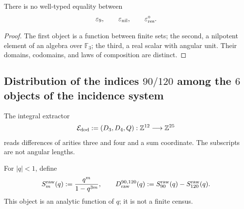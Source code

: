 {\begin{proposition}
\label{p12-83-c1-s7:prop:u006e-no-identificacion-epsilon}
There is no well-typed equality between
\[
 \varepsilon_9,\qquad
 \varepsilon_{\rm nil},\qquad
 \varepsilon_{\rm res}^{\circ}.
\]
\end{proposition}

\begin{proof}
The first object is a function between finite sets; the second, a
nilpotent element of an algebra over \(\mathbb F_3\); the third, a
real scalar with angular unit. Their domains, codomains, and laws of
composition are distinct.
\end{proof}

\subsection{Distribution of the indices \(90/120\) among the \(6\) objects of the incidence system}

\begin{definition}
\label{p12-83-c1-s7:def:u006e-extractor-dodecafasico}
The integral extractor
\begin{equation}
 \mathcal E_{\rm dod}:=(D_3,D_4,Q):
 \mathbb Z^{12}\longrightarrow\mathbb Z^{25}
 \label{p12-83-c1-s7:eq:u006e-extractor-dodecafasico}
\end{equation}
reads differences of arities three and four and a sum coordinate. The
subscripts are not angular lengths.
\end{definition}

\begin{definition}
\label{p12-83-c1-s7:def:u006e-diferencia-cruda}
For \(|q|<1\), define
\begin{equation}
 S_m^{\rm raw}(q):=\frac{q^m}{1-q^{3m}},
 \qquad
 D_{\rm raw}^{90,120}(q)
 :=S_{90}^{\rm raw}(q)-S_{120}^{\rm raw}(q).
 \label{p12-83-c1-s7:eq:u006e-series-crudas}
\end{equation}
This object is an analytic function of \(q\); it is not a finite census.
\end{definition}

}
